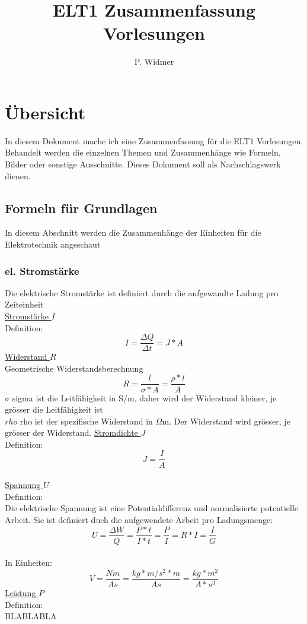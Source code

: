 \documentclass[a4paper,12pt,]{article}
\title{ELT1 Zusammenfassung Vorlesungen}
\author{P. Widmer}
\begin{document}
\maketitle
\tableofcontents
\newpage

\section{Übersicht}
In diesem Dokument mache ich eine Zusammenfassung für die ELT1 Vorlesungen. Behandelt werden die einzelnen Themen und Zusammenhänge wie Formeln, Bilder oder sonstige Ausschnitte. Dieses Dokument soll als Nachschlagswerk dienen.

\subsection{Formeln für Grundlagen}
In diesem Abschnitt werden die Zusammenhänge der Einheiten für die Elektrotechnik angeschaut

\subsubsection{el. Stromstärke}
Die elektrische Stromstärke ist definiert durch die aufgewandte Ladung pro Zeiteinheit\\
\underline{Stromstärke $I$}\\ 
Definition:
\begin{equation}
I = \frac{\Delta Q}{\Delta t} = {J}*{A}
\end{equation}
\underline{Widerstand $R$}\\
Geometrische Widerstandsberechnung\\
\begin{equation}
R = \frac{l}{\sigma*A} = \frac{\rho*l}{A}
\end{equation}
$\sigma$ sigma ist die Leitfähigkeit in S/m, daher wird der Widerstand kleiner, je grösser die Leitfähigkeit ist\\
$rho$ rho ist der spezifische Widerstand in $\Omega$m. Der Widerstand wird grösser, je grösser der Widerstand.
\underline{Stromdichte $J$}\\
Definition:
\begin{equation}
J = \frac{I}{A}
\end{equation}\\
\underline{Spannung $U$}\\
Definition:\\
Die elektrische Spannung ist eine Potentialdifferenz und normalisierte potentielle Arbeit. Sie ist definiert duch die aufgewendete Arbeit pro Ladungsmenge:
\begin{equation}
U = \frac{\Delta W}{Q} = \frac{P*t}{I*t} = \frac{P}{I} = R*I = \frac{I}{G}
\end{equation}\\
In Einheiten:
\begin{equation}
V = \frac{Nm}{As} = \frac{kg*m/s^2*m}{As} =\frac{kg*m^2}{A*s^3}
\end{equation}
\underline{Leistung $P$}\\
Definition:\\
BLABLABLA
\end{document}
